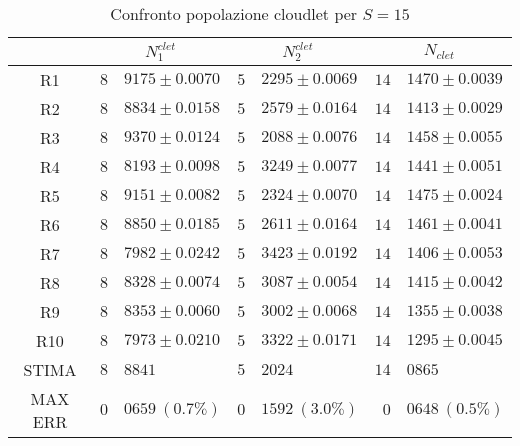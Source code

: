 \begin{table}[!h]
\begin{tabular}{c|r@{.}l|r@{.}l|r@{.}l}
& \multicolumn{2}{|c|}{$N_1^{clet}$}
& \multicolumn{2}{|c|}{$N_2^{clet}$}
& \multicolumn{2}{|c}{$N_{clet}$} 
\\          
\hline
R1      & $8$&$9175 \pm 0.0070$ & $5$&$2295 \pm 0.0069$ & $14$&$1470 \pm 0.0039$ \\
R2      & $8$&$8834 \pm 0.0158$ & $5$&$2579 \pm 0.0164$ & $14$&$1413 \pm 0.0029$ \\
R3      & $8$&$9370 \pm 0.0124$ & $5$&$2088 \pm 0.0076$ & $14$&$1458 \pm 0.0055$ \\
R4      & $8$&$8193 \pm 0.0098$ & $5$&$3249 \pm 0.0077$ & $14$&$1441 \pm 0.0051$ \\
R5      & $8$&$9151 \pm 0.0082$ & $5$&$2324 \pm 0.0070$ & $14$&$1475 \pm 0.0024$ \\
R6      & $8$&$8850 \pm 0.0185$ & $5$&$2611 \pm 0.0164$ & $14$&$1461 \pm 0.0041$ \\
R7      & $8$&$7982 \pm 0.0242$ & $5$&$3423 \pm 0.0192$ & $14$&$1406 \pm 0.0053$ \\
R8      & $8$&$8328 \pm 0.0074$ & $5$&$3087 \pm 0.0054$ & $14$&$1415 \pm 0.0042$ \\
R9      & $8$&$8353 \pm 0.0060$ & $5$&$3002 \pm 0.0068$ & $14$&$1355 \pm 0.0038$ \\
R10     & $8$&$7973 \pm 0.0210$ & $5$&$3322 \pm 0.0171$ & $14$&$1295 \pm 0.0045$ \\
STIMA   & $8$&$8841$            & $5$&$2024$            & $14$&$0865$            \\
MAX ERR & $0$&$0659 \ (0.7\%)$  & $0$&$1592 \ (3.0\%)$  & $0$&$0648 \ (0.5\%)$       
\end{tabular}
\centering
\caption{Confronto popolazione cloudlet per $S=15$}
\label{tab:15_nclet}
\end{table}
